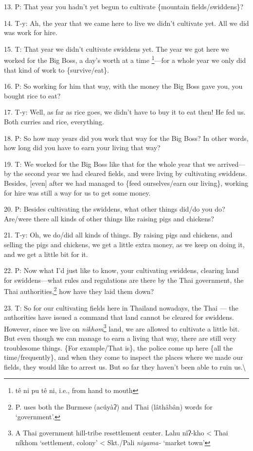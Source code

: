 13. P: That year you hadn't yet begun to cultivate \{mountain fields/swiddens\}?

14. T-y: Ah, the year that we came here to live we didn't cultivate yet. All we
did was work for hire.

15. T: That year we didn't cultivate swiddens yet. The year we got here we worked
for the Big Boss, a day's worth at a time \footnote{tê ni pu tê ni, i.e., from hand to mouth}---for a whole year we only did that
kind of work to \{survive/eat\}.

16. P: So working for him that way, with the money the Big Boss gave you, you bought
rice to eat?

17. T-y: Well, as far as rice goes, we didn't have to buy it to eat then! He fed
us. Both curries and rice, everything.

18. P: So how may years did you work that way for the Big Boss? In other words,
how long did you have to earn your living that way?

19. T: We worked for the Big Boss like that for the whole year that we arrived---by
the second year we had cleared fields, and were living by cultivating swiddens.
Besides, [even] after we had managed to \{feed ourselves/earn our living\}, working
for hire was still a way for us to get some money.

20. P: Besides cultivating the swiddens, what other things did/do you do? Are/were
there all kinds of other things like raising pigs and chickens?

21. T-y: Oh, we do/did all kinds of things. By raising pigs and chickens, and selling
the pigs and chickens, we get a little extra money, as we keep on doing it, and
we get a little bit for it.

22. P: Now what I'd just like to know, your cultivating swiddens, clearing land
for swiddens---what rules and regulations are there by the Thai government, the
Thai authorities,\footnote{P. uses both the Burmese (acúyàʔ) and Thai (lâthâbân) words for `government'.} how have they laid them down?

23. T: So for our cultivating fields here in Thailand nowadays, the Thai --- the
authorities have issued a command that land cannot be cleared for swiddens. However,
since we live on \textit{nikhom}\footnote{A Thai government hill-tribe resettlement center. Lahu nîʔ-kho < Thai níkhom `settlement, colony' < Skt./Pali \textit{niyama-} `market town'} land, we are allowed to cultivate a little
bit. But even though we can manage to earn a living that way, there are still very
troublesome things. \{For example/That is\}, the police come up here \{all the
time/frequently\}, and when they come to inspect the places where we made our fields,
they would like to arrest us. But so far they haven't been able to ruin us.\textbackslash{}

